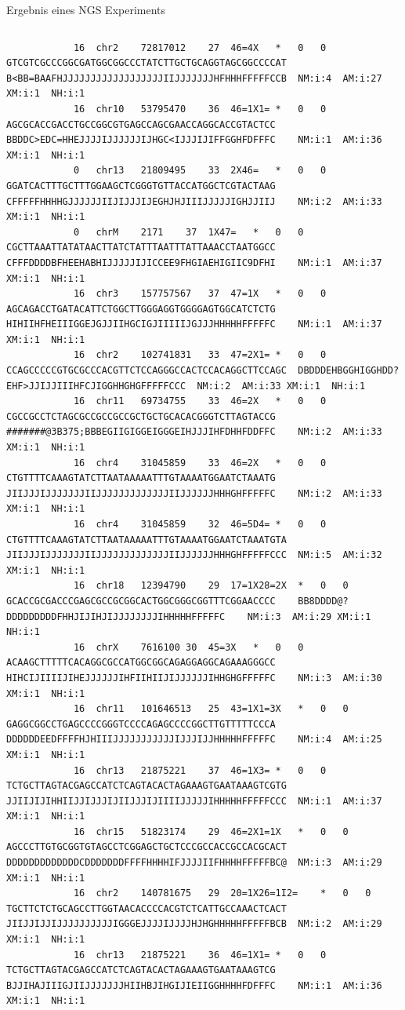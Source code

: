 \documentclass[10pt]{beamer}
\begin{document}
\begin{frame}[fragile]{Ergebnis eines NGS Experiments}
\begin{columns}
\begin{lstlisting}
			16	chr2	72817012	27	46=4X	*	0	0	GTCGTCGCCCGGCGATGGCGGCCCTATCTTGCTGCAGGTAGCGGCCCCAT	B<BB=BAAFHJJJJJJJJJJJJJJJJJJIIJJJJJJJHFHHHFFFFFCCB	NM:i:4	AM:i:27	XM:i:1	NH:i:1
			16	chr10	53795470	36	46=1X1=	*	0	0	AGCGCACCGACCTGCCGGCGTGAGCCAGCGAACCAGGCACCGTACTCC	BBDDC>EDC=HHEJJJJIJJJJJJIJHGC<IJJJIJIFFGGHFDFFFC	NM:i:1	AM:i:36	XM:i:1	NH:i:1
			0	chr13	21809495	33	2X46=	*	0	0	GGATCACTTTGCTTTGGAAGCTCGGGTGTTACCATGGCTCGTACTAAG	CFFFFFHHHHGJJJJJJIIJIJJJIJEGHJHJIIIJJJJJIGHJJIIJ	NM:i:2	AM:i:33	XM:i:1	NH:i:1
			0	chrM	2171	37	1X47=	*	0	0	CGCTTAAATTATATAACTTATCTATTTAATTTATTAAACCTAATGGCC	CFFFDDDDBFHEEHABHIJJJJJIJICCEE9FHGIAEHIGIIC9DFHI	NM:i:1	AM:i:37	XM:i:1	NH:i:1
			16	chr3	157757567	37	47=1X	*	0	0	AGCAGACCTGATACATTCTGGCTTGGGAGGTGGGGAGTGGCATCTCTG	HIHIIHFHEIIIGGEJGJJIIHGCIGJIIIIIJGJJJHHHHHFFFFFC	NM:i:1	AM:i:37	XM:i:1	NH:i:1
			16	chr2	102741831	33	47=2X1=	*	0	0	CCAGCCCCCGTGCGCCCACGTTCTCCAGGGCCACTCCACAGGCTTCCAGC	DBDDDEHBGGHIGGHDD?EHF>JJIJJIIIHFCJIGGHHGHGFFFFFCCC	NM:i:2	AM:i:33	XM:i:1	NH:i:1
			16	chr11	69734755	33	46=2X	*	0	0	CGCCGCCTCTAGCGCCGCCGCCGCTGCTGCACACGGGTCTTAGTACCG	#######@3B375;BBBEGIIGIGGEIGGGEIHJJJIHFDHHFDDFFC	NM:i:2	AM:i:33	XM:i:1	NH:i:1
			16	chr4	31045859	33	46=2X	*	0	0	CTGTTTTCAAAGTATCTTAATAAAAATTTGTAAAATGGAATCTAAATG	JIIJJJIJJJJJJJIIJJJJJJJJJJJJJIIJJJJJJHHHGHFFFFFC	NM:i:2	AM:i:33	XM:i:1	NH:i:1
			16	chr4	31045859	32	46=5D4=	*	0	0	CTGTTTTCAAAGTATCTTAATAAAAATTTGTAAAATGGAATCTAAATGTA	JIIJJJIJJJJJJJIIJJJJJJJJJJJJJIIJJJJJJHHHGHFFFFFCCC	NM:i:5	AM:i:32	XM:i:1	NH:i:1
			16	chr18	12394790	29	17=1X28=2X	*	0	0	GCACCGCGACCCGAGCGCCGCGGCACTGGCGGGCGGTTTCGGAACCCC	BB8DDDD@?DDDDDDDDDFHHJIJIHJIJJJJJJJJIHHHHHFFFFFC	NM:i:3	AM:i:29	XM:i:1	NH:i:1
			16	chrX	7616100	30	45=3X	*	0	0	ACAAGCTTTTTCACAGGCGCCATGGCGGCAGAGGAGGCAGAAAGGGCC	HIHCIJIIIIJIHEJJJJJJIHFIIHIIJIJJJJJJIHHGHGFFFFFC	NM:i:3	AM:i:30	XM:i:1	NH:i:1
			16	chr11	101646513	25	43=1X1=3X	*	0	0	GAGGCGGCCTGAGCCCCGGGTCCCCAGAGCCCCGGCTTGTTTTTCCCA	DDDDDDEEDFFFFHJHIIIJJJJJJJJJJJIJJJIJJHHHHHFFFFFC	NM:i:4	AM:i:25	XM:i:1	NH:i:1
			16	chr13	21875221	37	46=1X3=	*	0	0	TCTGCTTAGTACGAGCCATCTCAGTACACTAGAAAGTGAATAAAGTCGTG	JJIIJIJIHHIIJJIJJJIJIIJJJIJIIIIJJJJJIHHHHHFFFFFCCC	NM:i:1	AM:i:37	XM:i:1	NH:i:1
			16	chr15	51823174	29	46=2X1=1X	*	0	0	AGCCCTTGTGCGGTGTAGCCTCGGAGCTGCTCCCGCCACCGCCACGCACT	DDDDDDDDDDDDDCDDDDDDDFFFFHHHHIFJJJJIIFHHHHFFFFFBC@	NM:i:3	AM:i:29	XM:i:1	NH:i:1
			16	chr2	140781675	29	20=1X26=1I2=	*	0	0	TGCTTCTCTGCAGCCTTGGTAACACCCCACGTCTCATTGCCAAACTCACT	JIIJJIJJIJJJJJJJJJJIGGGEJJJJIJJJJHJHGHHHHHFFFFFBCB	NM:i:2	AM:i:29	XM:i:1	NH:i:1
			16	chr13	21875221	36	46=1X1=	*	0	0	TCTGCTTAGTACGAGCCATCTCAGTACACTAGAAAGTGAATAAAGTCG	BJJIHAJIIIGJIIJJJJJJJHIIHBJIHGIJIEIIGGHHHHFDFFFC	NM:i:1	AM:i:36	XM:i:1	NH:i:1

\end{lstlisting}
\end{columns}
\end{frame}
\end{document}

